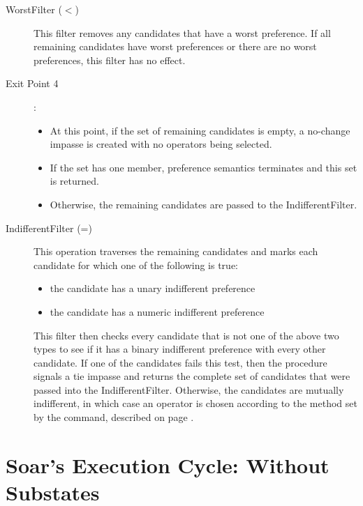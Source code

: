 \begin{description}
	\item[WorstFilter ($<$) ] This filter removes any candidates that have a worst preference. If all remaining candidates have worst preferences or there are no worst preferences, this filter has no effect.

	\item[Exit Point 4]:
	\begin{itemize}
		\item At this point, if the set of remaining candidates is empty, a no-change impasse is created with no operators being selected.
		\item If the set has one member, preference semantics terminates and this set is returned.
		\item Otherwise, the remaining candidates are passed to the IndifferentFilter.
	\end{itemize}

	\item[IndifferentFilter (=) ] This operation traverses the remaining candidates and marks each candidate for which one of the following is true:
	\begin{itemize}
		\item the candidate has a unary indifferent preference
		\item the candidate has a numeric indifferent preference
	\end{itemize}
	This filter then checks every candidate that is not one of the above two types to see if it has a binary indifferent preference with every other candidate. If one of the candidates fails this test, then the procedure signals a tie impasse and returns the complete set of candidates that were passed into the IndifferentFilter. Otherwise, the candidates are mutually indifferent, in which case an operator is chosen according to the method set by the  command, described on page \pageref{decide-indifferent-selection}.
\end{description}

\section{Soar's Execution Cycle: Without Substates}
\label{ARCH-decision}


